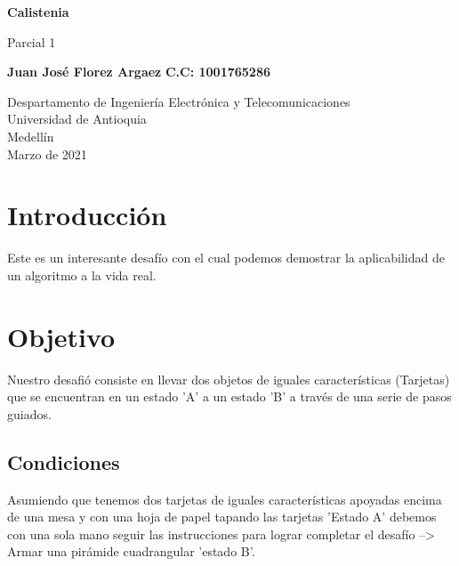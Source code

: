 \documentclass{article}
\begin{document}
\begin{titlepage}
    \begin{center}
        \vspace*{1cm}
            
        \Huge
        \textbf{Calistenia}
            
        \vspace{0.5cm}
        \LARGE
        Parcial 1
            
        \vspace{1.5cm}
            
        \textbf{Juan José Florez Argaez}
        \textbf{C.C: 1001765286}
        
            
        \vfill
            
        \vspace{0.8cm}
            
        \Large
        Despartamento de Ingeniería Electrónica y Telecomunicaciones\\
        Universidad de Antioquia\\
        Medellín\\
        Marzo de 2021
            
    \end{center}
\end{titlepage}

\tableofcontents
\newpage
\section{Introducción}\label{intro}
Este es un interesante desafío con el cual podemos demostrar la aplicabilidad de un algoritmo a la vida real.

\section{Objetivo}\label{intro}
Nuestro desafió consiste en llevar dos objetos de iguales características (Tarjetas) que se encuentran en un estado 'A' a un estado 'B' a través de una serie de pasos guiados.
\subsection{Condiciones}
Asumiendo que tenemos dos tarjetas de iguales características apoyadas encima de una mesa y con una hoja de papel tapando las tarjetas 'Estado A' debemos con una sola mano seguir las instrucciones para lograr completar el desafío --> Armar una pirámide cuadrangular 'estado B'.
\end{document}
